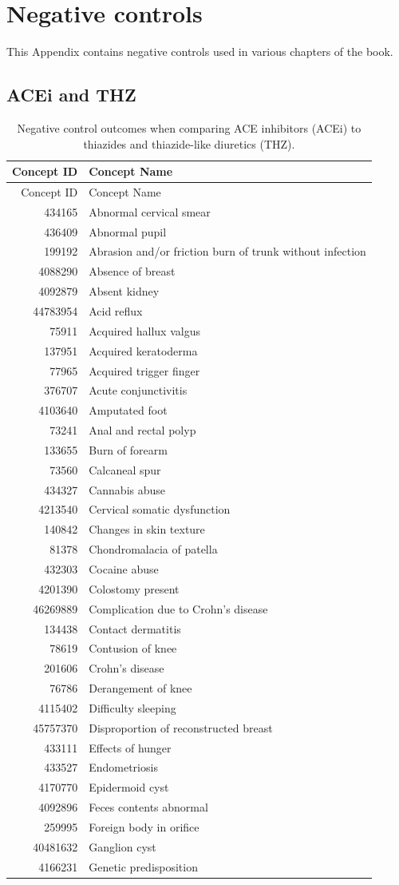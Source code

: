 \documentclass[11pt]{book}
\theoremstyle{definition}
\theoremstyle{definition}
\theoremstyle{definition}
\theoremstyle{remark}
\begin{document}
\hypertarget{NegativeControlsAppendix}{%
\chapter{Negative controls}\label{NegativeControlsAppendix}}

This Appendix contains negative controls used in various chapters of the book.

\hypertarget{AceiThzNsc}{%
\section{ACEi and THZ}\label{AceiThzNsc}}

\begin{longtable}[]{@{}rl@{}}
\caption{\label{tab:AceiThzNsc} Negative control outcomes when comparing ACE inhibitors (ACEi) to thiazides and thiazide-like diuretics (THZ).}\tabularnewline
\toprule
Concept ID & Concept Name\tabularnewline
\midrule
\endfirsthead
\toprule
Concept ID & Concept Name\tabularnewline
\midrule
\endhead
434165 & Abnormal cervical smear\tabularnewline
436409 & Abnormal pupil\tabularnewline
199192 & Abrasion and/or friction burn of trunk without infection\tabularnewline
4088290 & Absence of breast\tabularnewline
4092879 & Absent kidney\tabularnewline
44783954 & Acid reflux\tabularnewline
75911 & Acquired hallux valgus\tabularnewline
137951 & Acquired keratoderma\tabularnewline
77965 & Acquired trigger finger\tabularnewline
376707 & Acute conjunctivitis\tabularnewline
4103640 & Amputated foot\tabularnewline
73241 & Anal and rectal polyp\tabularnewline
133655 & Burn of forearm\tabularnewline
73560 & Calcaneal spur\tabularnewline
434327 & Cannabis abuse\tabularnewline
4213540 & Cervical somatic dysfunction\tabularnewline
140842 & Changes in skin texture\tabularnewline
81378 & Chondromalacia of patella\tabularnewline
432303 & Cocaine abuse\tabularnewline
4201390 & Colostomy present\tabularnewline
46269889 & Complication due to Crohn's disease\tabularnewline
134438 & Contact dermatitis\tabularnewline
78619 & Contusion of knee\tabularnewline
201606 & Crohn's disease\tabularnewline
76786 & Derangement of knee\tabularnewline
4115402 & Difficulty sleeping\tabularnewline
45757370 & Disproportion of reconstructed breast\tabularnewline
433111 & Effects of hunger\tabularnewline
433527 & Endometriosis\tabularnewline
4170770 & Epidermoid cyst\tabularnewline
4092896 & Feces contents abnormal\tabularnewline
259995 & Foreign body in orifice\tabularnewline
40481632 & Ganglion cyst\tabularnewline
4166231 & Genetic predisposition\tabularnewline

\end{longtable}
\end{document}
